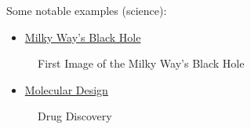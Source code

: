 \documentclass[
  paper=6in:9in,
  pagesize=pdftex,
  headinclude=on,
  footinclude=on,
  12pt]{scrbook}
\providecommand{\tightlist}{%
  \setlength{\itemsep}{0pt}\setlength{\parskip}{0pt}}\usepackage{longtable,booktabs,array}
\begin{document}
Some notable examples (science):

\begin{itemize}
\tightlist
\item
  \href{https://physics.aps.org/articles/v15/74}{Milky Way's Black Hole}
\end{itemize}

\begin{figure}[H]


\caption{\label{fig-BH}First Image of the Milky Way's Black Hole}

\end{figure}%

\begin{itemize}
\tightlist
\item
  \href{https://www.microsoft.com/en-us/research/blog/fs-mol-bringing-deep-learning-to-early-stage-drug-discovery/}{Molecular
  Design}
\end{itemize}

\begin{figure}[H]


\caption{\label{fig-drug}Drug Discovery}

\end{figure}%
\end{document}
